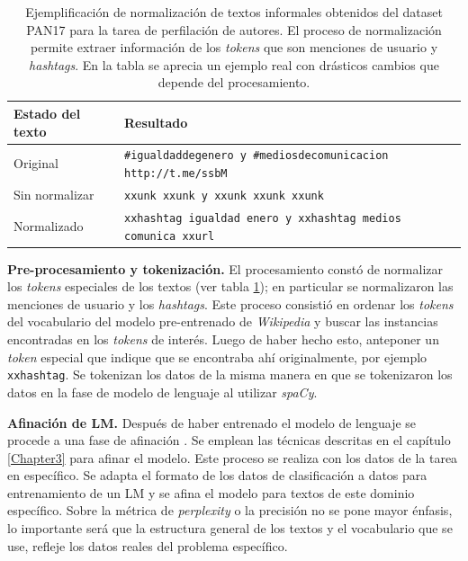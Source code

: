 \begin{table}
\centering
{}
\begin{tabular}{| p{3cm} | p{9.5cm} |}
\hline
\textbf{Estado del texto} & \textbf{Resultado} \\
\hline
Original & \texttt{\#igualdaddegenero y \#mediosdecomunicacion http://t.me/ssbM} \\
Sin normalizar & \texttt{xxunk xxunk y xxunk xxunk xxunk} \\
Normalizado & \texttt{xxhashtag igualdad enero y xxhashtag medios comunica xxurl} \\
\hline
\end{tabular}
\caption{Ejemplificación de normalización de textos informales obtenidos del dataset PAN17 para la tarea de perfilación de autores. El proceso de normalización permite extraer información de los \textit{tokens} que son menciones de usuario y \textit{hashtags}. En la tabla se aprecia un ejemplo real con drásticos cambios que depende del procesamiento.}
\label{tab:pan17preproc}
\end{table}

\textbf{Pre-procesamiento y tokenización.} El procesamiento constó de normalizar los \textit{tokens} especiales de los textos (ver tabla \ref{tab:pan17preproc}); en particular se normalizaron las menciones de usuario y los \textit{hashtags}. Este proceso consistió en ordenar los \textit{tokens} del vocabulario del modelo pre-entrenado de \textit{Wikipedia} y buscar las instancias encontradas en los \textit{tokens} de interés. Luego de haber hecho esto, anteponer un \textit{token} especial que indique que se encontraba ahí originalmente, por ejemplo \texttt{xxhashtag}. Se tokenizan los datos de la misma manera en que se tokenizaron los datos en la fase de modelo de lenguaje al utilizar \textit{spaCy}.

\textbf{Afinación de LM.} Después de haber entrenado el modelo de lenguaje se procede a una fase de afinación \parencite{howard2018}. Se emplean las técnicas descritas en el capítulo \ref{Chapter3} para afinar el modelo. Este proceso se realiza con los datos de la tarea en específico. Se adapta el formato de los datos de clasificación a datos para entrenamiento de un LM y se afina el modelo para textos de este dominio específico. Sobre la métrica de \textit{perplexity} o la precisión no se pone mayor énfasis, lo importante será que la estructura general de los textos y el vocabulario que se use, refleje los datos reales del problema específico.

